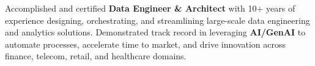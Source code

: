 
\begin{cvparagraph}
Accomplished and certified \textbf{Data Engineer \& Architect} with 10+ years of experience designing, orchestrating, and streamlining large-scale data engineering and analytics solutions. Demonstrated track record in leveraging \textbf{AI/GenAI} to automate processes, accelerate time to market, and drive innovation across finance, telecom, retail, and healthcare domains.
\end{cvparagraph}

\vspace{6pt}
